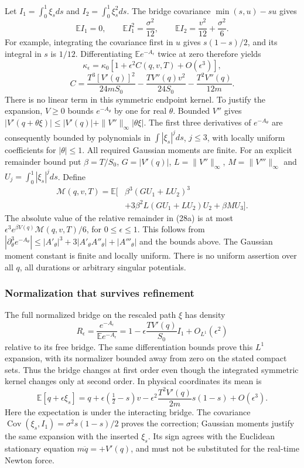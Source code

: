 \documentclass[11pt,a4paper]{article}
\begin{document}
Let \(I_1=\int_0^1\xi_s ds\) and \(I_2=\int_0^1\xi_s^2 ds\). The bridge
covariance \(\min(s,u)-su\) gives \[
 \mathbb EI_1=0,\qquad
 \mathbb EI_1^2=\frac{\sigma^2}{12},\qquad
 \mathbb EI_2=\frac{v^2}{12}+\frac{\sigma^2}{6}.
\] For example, integrating the covariance first in \(u\) gives
\(s(1-s)/2\), and its integral in \(s\) is \(1/12\). Differentiating
\(\mathbb E e^{-A_\epsilon}\) twice at zero therefore yields \[
 \kappa_\epsilon=\kappa_0
          [1+\epsilon^2 C(q,v,T)+O(\epsilon^3)],
 \tag{28a}
\] \[
 C=\frac{T^3[V'(q)]^2}{24mS_0}
    -\frac{T V''(q)v^2}{24S_0}
    -\frac{T^2V''(q)}{12m}.
 \tag{28b}
\] There is no linear term in this symmetric endpoint kernel. To justify
the expansion, \(V\ge0\) bounds \(e^{-A_\theta}\) by one for real
\(\theta\). Bounded \(V''\) gives
\(|V'(q+\theta\xi)|\le |V'(q)|+\|V''\|_\infty|\theta\xi|\). The first
three derivatives of \(e^{-A_\theta}\) are consequently bounded by
polynomials in \(\int|\xi_s|^jds\), \(j\le3\), with locally uniform
coefficients for \(|\theta|\le1\). All required Gaussian moments are
finite. For an explicit remainder bound put \(\beta=T/S_0\),
\(G=|V'(q)|\), \(L=\|V''\|_\infty\), \(M=\|V'''\|_\infty\) and
\(U_j=\int_0^1|\xi_s|^jds\). Define \[
 \begin{aligned}
 \mathcal M(q,v,T)=\mathbb E\big[&\beta^3(GU_1+LU_2)^3\\
 &+3\beta^2 L(GU_1+LU_2)U_2+\beta M U_3\big].
 \end{aligned}
\] The absolute value of the relative remainder in (28a) is at most
\(\epsilon^3 e^{\beta V(q)}\mathcal M(q,v,T)/6\), for
\(0\le\epsilon\le1\). This follows from
\(|\partial_\theta^3 e^{-A_\theta}|\le
|A'_\theta|^3+3|A'_\theta A''_\theta|+|A'''_\theta|\) and the bounds
above. The Gaussian moment constant is finite and locally uniform. There
is no uniform assertion over all \(q\), all durations or arbitrary
singular potentials.

\subsubsection{Normalization that survives
refinement}\label{normalization-that-survives-refinement}

The full normalized bridge on the rescaled path \(\xi\) has density \[
 R_\epsilon=\frac{e^{-A_\epsilon}}{\mathbb E e^{-A_\epsilon}}
 =1-\epsilon\frac{T V'(q)}{S_0}I_1+O_{L^1}(\epsilon^2)
 \tag{29}
\] relative to its free bridge. The same differentiation bounds prove
this \(L^1\) expansion, with its normalizer bounded away from zero on
the stated compact sets. Thus the bridge changes at first order even
though the integrated symmetric kernel changes only at second order. In
physical coordinates its mean is \[
 \mathbb E[q+\epsilon\xi_s]
 =q+\epsilon(\tfrac12-s)v
   -\epsilon^2\frac{T^2V'(q)}{2m}s(1-s)+O(\epsilon^3).
 \tag{30}
\] Here the expectation is under the interacting bridge. The covariance
\(\operatorname{Cov}(\xi_s,I_1)=\sigma^2s(1-s)/2\) proves the
correction; Gaussian moments justify the same expansion with the
inserted \(\xi_s\). Its sign agrees with the Euclidean stationary
equation \(m\ddot q=+V'(q)\), and must not be substituted for the
real-time Newton force.
\end{document}
